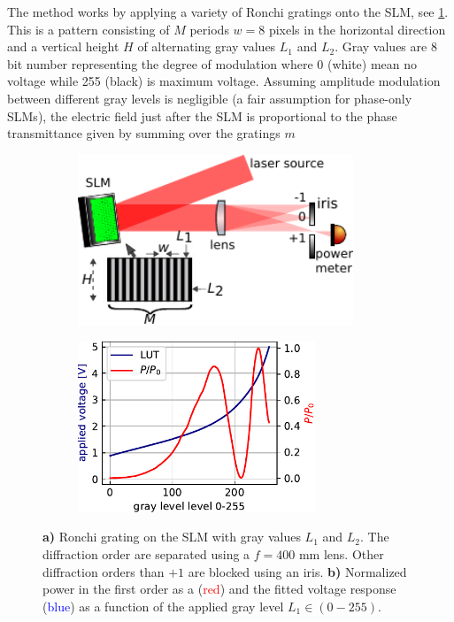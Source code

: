 The method works by applying a variety of Ronchi gratings onto the SLM, see \cref{fig:LUTCalibrationSetup}.
This is a pattern consisting of $M$ periods $w=8$ pixels in the horizontal direction and a vertical height $H$ of alternating gray values $L_1$ and $L_2$.
Gray values are 8 bit number representing the degree of modulation where 0 (white) mean no voltage while 255 (black) is maximum voltage. 
Assuming amplitude modulation between different gray levels is negligible (a fair assumption for phase-only SLMs), the electric field just after the SLM is proportional to the phase transmittance given by summing over the gratings $m$ \cite{Zhang1994}

\begin{figure}
	\begin{subfigure}{.49\linewidth}
		\flushleft
		\includegraphics[height=5.1cm]{figures/LUTcalibrationSetup.pdf}
		\caption{}
		\label{fig:LUTCalibrationSetup}
	\end{subfigure}
	\hfill
	\begin{subfigure}{.49\linewidth}
		\flushright
		\includegraphics[height=5.1cm]{figures/LUTplot.pdf}
		\caption{}
		\label{fig:LUTcalibration}
	\end{subfigure}
	\caption{\textbf{a)} Ronchi grating on the SLM with gray values $L_1$ and $L_2$. 
	The diffraction order are separated using a $f=400$ mm lens. 
	Other diffraction orders than $+1$ are blocked using an iris. 
	\textbf{b)} Normalized power in the first order as a (\textcolor{red}{red}) and the fitted voltage response (\textcolor{blue}{blue}) as a function of the applied gray level $L_1 \in (0-255)$.}
\end{figure}

